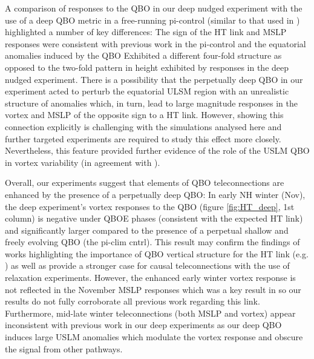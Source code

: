 A comparison of responses to the QBO in our deep nudged experiment with the use of a deep QBO metric in a free-running pi-control (similar to that used in \cite{andrewsObserved2019d}) highlighted a number of key differences: The sign of the HT link and MSLP responses were consistent with previous work in the pi-control and the equatorial anomalies induced by the QBO Exhibited a different four-fold structure as opposed to the two-fold pattern in height exhibited by responses in the deep nudged experiment. There is a possibility that the perpetually deep QBO in our experiment acted to perturb the equatorial ULSM region with an unrealistic structure of anomalies which, in turn, lead to large magnitude responses in the vortex and MSLP of the opposite sign to a HT link. However, showing this connection explicitly is challenging with the simulations analysed here and further targeted experiments are required to study this effect more closely. Nevertheless, this feature provided further evidence of the role of the USLM QBO in vortex variability (in agreement with \cite{grayForecasting2020a}). 

Overall, our experiments suggest that elements of QBO teleconnections are enhanced by the presence of a perpetually deep QBO: In early NH winter (Nov), the deep experiment's vortex responses to the QBO (figure \ref{fig:HT_deep}, 1st column) is negative under QBOE phases (consistent with the expected HT link) and significantly larger compared to the presence of a perpetual shallow and freely evolving QBO (the pi-clim cntrl). This result may confirm the findings of works highlighting the importance of QBO vertical structure for the HT link (e.g. \cite{graySurface2018b}) as well as provide a stronger case for causal teleconnections with the use of relaxation experiments. However, the enhanced early winter vortex response is not reflected in the November MSLP responses which was a key result in \cite{andrewsObserved2019d} so our results do not fully corroborate all previous work regarding this link. Furthermore, mid-late winter teleconnections (both MSLP and vortex) appear inconsistent with previous work in our deep experiments as our deep QBO induces large USLM anomalies which modulate the vortex response and obscure the signal from other pathways. 

